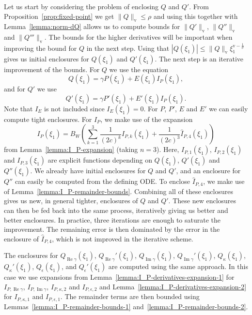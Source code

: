 \documentclass[11pt]{article}
\DeclareMathOperator{\real}{Re}
\DeclareMathOperator{\imag}{Im}
\newcommand{\normv}{\mathrm{v}}
\begin{document}
Let us start by considering the problem of enclosing \(Q\) and \(Q'\).
From Proposition~\ref{prop:fixed-point} we get
\(\|Q\|_{\normv} \leq \rho\) and using this together with
Lemma~\ref{lemma:norm-dQ} allows us to compute bounds for
\(\|Q'\|_{\normv}\), \(\|Q''\|_{\normv}\) and \(\|Q'''\|_{\normv}\).
The bounds for the higher derivatives will be important when improving
the bound for \(Q\) in the next step. Using that
\(|Q(\xi_{1})| \leq \|Q\|_{\normv}\xi_{1}^{\normv -
  \frac{1}{\sigma}}\) gives us initial enclosures for
\(Q(\xi_{1})\) and \(Q'(\xi_{1})\). The next step is an iterative
improvement of the bounds. For \(Q\) we use the equation
\begin{equation*}
  Q(\xi_{1}) = \gamma P(\xi_{1})
  + E(\xi_{1})I_{P}(\xi_{1}),
\end{equation*}
and for \(Q'\) we use
\begin{equation*}
  Q'(\xi_{1}) = \gamma P'(\xi_{1})
  + E'(\xi_{1})I_{P}(\xi_{1}).
\end{equation*}
Note that \(I_{E}\) is not included since \(I_{E}(\xi_{1}) = 0\). For
\(P\), \(P'\), \(E\) and \(E'\) we can easily compute tight
enclosures. For \(I_{P}\), we make use of the expansion
\begin{equation*}
  I_{P}(\xi_{1}) =
  B_{W}\left(
    \sum_{k = 1}^{3} \frac{1}{(2c)^{k}} I_{P,k}(\xi_{1})
    + \frac{1}{(2c)^{3}}\hat{I}_{P,4}(\xi_{1})
  \right)
\end{equation*}
from Lemma~\ref{lemma:I_P-expansion} (taking \(n = 3\)). Here,
\(I_{P,1}(\xi_{1})\), \(I_{P,2}(\xi_{1})\) and \(I_{P,3}(\xi_{1})\)
are explicit functions depending on \(Q(\xi_{1})\), \(Q'(\xi_{1})\)
and \(Q''(\xi_{1})\). We already have initial enclosures for \(Q\) and
\(Q'\), and an enclosure for \(Q''\) can easily be computed from the
defining ODE. To enclose \(\hat{I}_{P,4}\), we make use of
Lemma~\ref{lemma:I_P-remainder-bounds}. Combining all of these
enclosures gives us new, in general tighter, enclosures of \(Q\) and
\(Q'\). These new enclosures can then be fed back into the same
process, iteratively giving us better and better enclosures. In
practice, three iterations are enough to saturate the improvement. The
remaining error is then dominated by the error in the enclosure of
\(\hat{I}_{P,4}\), which is not improved in the iterative scheme.

The enclosures for \(Q_{\real\gamma}(\xi_{1})\),
\(Q_{\real\gamma}'(\xi_{1})\), \(Q_{\imag\gamma}(\xi_{1})\),
\(Q_{\imag\gamma}'(\xi_{1})\), \(Q_{\kappa}(\xi_{1})\),
\(Q_{\kappa}'(\xi_{1})\), \(Q_{\epsilon}(\xi_{1})\), and
\(Q_{\epsilon}'(\xi_{1})\) are computed using the same approach. In
this case we use expansions from
Lemma~\ref{lemma:I_P-derivatives-expansion-1} for
\(I_{P,\real\gamma}\), \(I_{P,\imag\gamma}\), \(I_{P,\kappa,2}\) and
\(I_{P,\epsilon,2}\) and Lemma~\ref{lemma:I_P-derivatives-expansion-2}
for \(I_{P,\kappa,1}\) and \(I_{P,\epsilon,1}\). The remainder terms
are then bounded using Lemmas~\ref{lemma:I_P-remainder-bounds-1}
and~\ref{lemma:I_P-remainder-bounds-2}.
\end{document}

